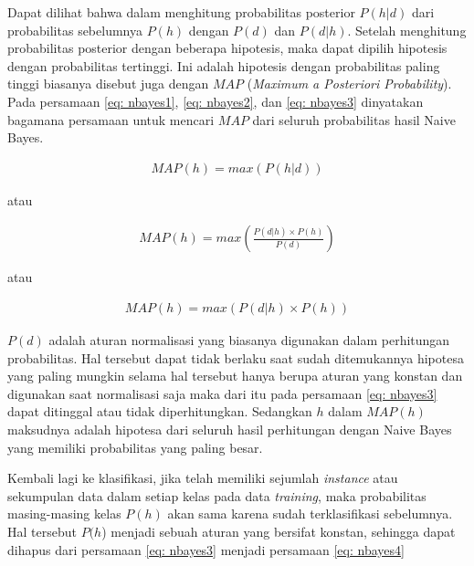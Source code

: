 \begin{subs}
	Dapat dilihat bahwa dalam menghitung probabilitas posterior $P(h|d)$ dari probabilitas sebelumnya $P(h)$ dengan $P(d)$ dan $P(d|h)$. Setelah menghitung probabilitas posterior dengan beberapa hipotesis, maka dapat dipilih hipotesis dengan probabilitas tertinggi. Ini adalah hipotesis dengan probabilitas paling tinggi biasanya disebut juga dengan $MAP$ (\textit{Maximum a Posteriori Probability}). Pada persamaan \ref{eq: nbayes1}, \ref{eq: nbayes2}, dan \ref{eq: nbayes3} dinyatakan bagamana persamaan untuk mencari $MAP$ dari seluruh probabilitas hasil Naive Bayes.
	\vspace{1ex}
	
	\begin{equation}\label{eq: nbayes1}
	\begin{split}
	MAP(h) = max(P(h|d))
	\end{split}
	\end{equation}
	
	\noindent atau
	
	\begin{equation}\label{eq: nbayes2}
	\begin{split}
	MAP(h) = max\left(\frac{P(d|h) \times P(h)}{P(d)} \right)
	\end{split}
	\end{equation}
	
	\noindent atau
	
	\begin{equation}\label{eq: nbayes3}
	\begin{split}
	MAP(h) = max(P(d|h) \times P(h))
	\end{split}
	\end{equation}
	
	$P(d)$ adalah aturan normalisasi yang biasanya digunakan dalam perhitungan probabilitas. Hal tersebut dapat tidak berlaku saat sudah ditemukannya hipotesa yang paling mungkin selama hal tersebut hanya berupa aturan yang konstan dan digunakan saat normalisasi saja maka dari itu pada persamaan \ref{eq: nbayes3} dapat ditinggal atau tidak diperhitungkan. Sedangkan $h$ dalam $MAP(h)$ maksudnya adalah hipotesa dari seluruh hasil perhitungan dengan Naive Bayes yang memiliki probabilitas yang paling besar.
	\vspace{1ex}
	
	Kembali lagi ke klasifikasi, jika telah memiliki sejumlah \textit{instance} atau sekumpulan data dalam setiap kelas pada data \textit{training}, maka probabilitas masing-masing kelas $P(h)$ akan sama karena sudah terklasifikasi sebelumnya. Hal tersebut $P(h$) menjadi sebuah aturan yang bersifat konstan, sehingga dapat dihapus dari persamaan \ref{eq: nbayes3} menjadi persamaan \ref{eq: nbayes4}
	

\end{subs}
